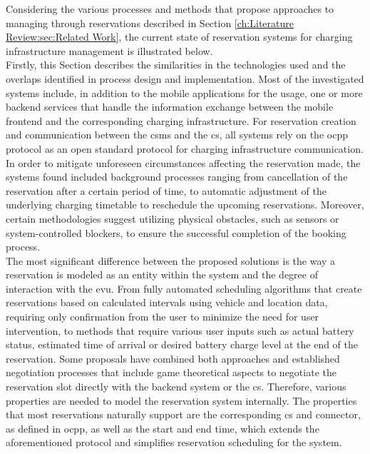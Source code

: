 Considering the various processes and methods that propose approaches to managing  through reservations described in Section \ref{ch:Literature Review:sec:Related Work}, the current state of reservation systems for charging infrastructure management is illustrated below. \\
\noindent Firstly, this Section describes the similarities in the technologies used and the overlaps identified in process design and implementation.
Most of the investigated systems include, in addition to the mobile applications for the  usage, one or more backend services that handle the information exchange between the mobile frontend and the corresponding charging infrastructure.
For reservation creation and communication between the \acrshort{csms} and the \acrshort{cs}, all systems rely on the \acrshort{ocpp} protocol as an open standard protocol for charging infrastructure communication.
In order to mitigate unforeseen circumstances affecting the reservation made, the systems found included background processes ranging from cancellation of the reservation after a certain period of time, to automatic adjustment of the underlying charging timetable to reschedule the upcoming reservations.
Moreover, certain methodologies suggest utilizing physical obstacles, such as sensors or system-controlled blockers, to ensure the successful completion of the booking process. \\
\noindent The most significant difference between the proposed solutions is the way a reservation is modeled as an entity within the system and the degree of interaction with the \acrshort{evu}.
From fully automated scheduling algorithms that create reservations based on calculated intervals using vehicle and location data, requiring only confirmation from the user to minimize the need for user intervention, to methods that require various user inputs such as actual battery status, estimated time of arrival or desired battery charge level at the end of the reservation.
Some proposals have combined both approaches and established negotiation processes that include game theoretical aspects to negotiate the reservation slot directly with the backend system or the \acrshort{cs}.
Therefore, various properties are needed to model the reservation system internally. The properties that most reservations naturally support are the corresponding \acrshort{cs} and connector, as defined in \acrshort{ocpp}, as well as the start and end time, which extends the aforementioned protocol and simplifies reservation scheduling for the system. \\
